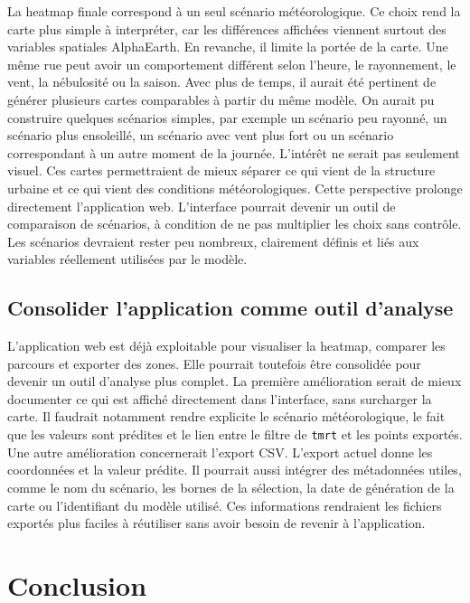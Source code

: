 \documentclass{article}
\begin{document}
La heatmap finale correspond à un seul scénario météorologique. Ce choix rend la carte plus simple à interpréter, car les différences affichées viennent surtout des variables spatiales AlphaEarth. En revanche, il limite la portée de la carte. Une même rue peut avoir un comportement différent selon l'heure, le rayonnement, le vent, la nébulosité ou la saison.
Avec plus de temps, il aurait été pertinent de générer plusieurs cartes comparables à partir du même modèle. On aurait pu construire quelques scénarios simples, par exemple un scénario peu rayonné, un scénario plus ensoleillé, un scénario avec vent plus fort ou un scénario correspondant à un autre moment de la journée. L'intérêt ne serait pas seulement visuel. Ces cartes permettraient de mieux séparer ce qui vient de la structure urbaine et ce qui vient des conditions météorologiques.
Cette perspective prolonge directement l'application web. L'interface pourrait devenir un outil de comparaison de scénarios, à condition de ne pas multiplier les choix sans contrôle. Les scénarios devraient rester peu nombreux, clairement définis et liés aux variables réellement utilisées par le modèle.

\subsection{Consolider l'application comme outil d'analyse}

L'application web est déjà exploitable pour visualiser la heatmap, comparer les parcours et exporter des zones. Elle pourrait toutefois être consolidée pour devenir un outil d'analyse plus complet. La première amélioration serait de mieux documenter ce qui est affiché directement dans l'interface, sans surcharger la carte. Il faudrait notamment rendre explicite le scénario météorologique, le fait que les valeurs sont prédites et le lien entre le filtre de \texttt{tmrt} et les points exportés.
Une autre amélioration concernerait l'export CSV. L'export actuel donne les coordonnées et la valeur prédite. Il pourrait aussi intégrer des métadonnées utiles, comme le nom du scénario, les bornes de la sélection, la date de génération de la carte ou l'identifiant du modèle utilisé. Ces informations rendraient les fichiers exportés plus faciles à réutiliser sans avoir besoin de revenir à l'application.

\newpage

\section{Conclusion}
\end{document}
